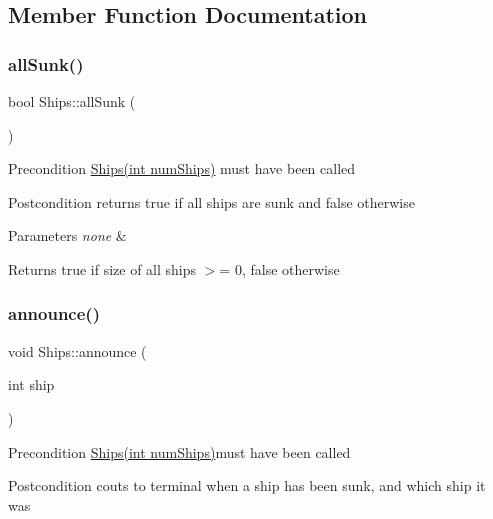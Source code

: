\subsection{Member Function Documentation}
\mbox{\label{classShips_a401ed503f23bb11e6707a687ad831b62}} 
\subsubsection{\texorpdfstring{all\+Sunk()}{allSunk()}}
{\footnotesize\ttfamily bool Ships\+::all\+Sunk (\begin{DoxyParamCaption}{ }\end{DoxyParamCaption})}

\begin{DoxyPrecond}{Precondition}
\hyperlink{classShips_aabbca77f901e307950267b22383be013}{Ships(int num\+Ships)} must have been called 
\end{DoxyPrecond}
\begin{DoxyPostcond}{Postcondition}
returns true if all ships are sunk and false otherwise 
\end{DoxyPostcond}

\begin{DoxyParams}{Parameters}
{\em none} & \\
\hline
\end{DoxyParams}
\begin{DoxyReturn}{Returns}
true if size of all ships $>$= 0, false otherwise 
\end{DoxyReturn}
\mbox{\label{classShips_aaf0177a1d238c8d6f169c1476072e440}} 
\subsubsection{\texorpdfstring{announce()}{announce()}}
{\footnotesize\ttfamily void Ships\+::announce (\begin{DoxyParamCaption}\item[{int}]{ship }\end{DoxyParamCaption})}

\begin{DoxyPrecond}{Precondition}
\hyperlink{classShips_aabbca77f901e307950267b22383be013}{Ships(int num\+Ships)}must have been called 
\end{DoxyPrecond}
\begin{DoxyPostcond}{Postcondition}
couts to terminal when a ship has been sunk, and which ship it was 
\end{DoxyPostcond}

